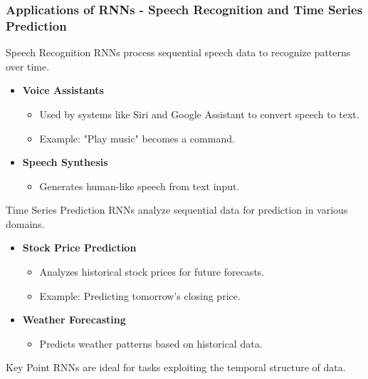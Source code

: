 \documentclass[aspectratio=169]{beamer}
\begin{document}
\begin{frame}[fragile]
    \frametitle{Applications of RNNs - Speech Recognition and Time Series Prediction}
    \begin{block}{Speech Recognition}
        RNNs process sequential speech data to recognize patterns over time.
    \end{block}
    
    \begin{itemize}
        \item \textbf{Voice Assistants}
            \begin{itemize}
                \item Used by systems like Siri and Google Assistant to convert speech to text.
                \item Example: "Play music" becomes a command.
            \end{itemize}
        
        \item \textbf{Speech Synthesis}
            \begin{itemize}
                \item Generates human-like speech from text input.
            \end{itemize}
    \end{itemize}

    \begin{block}{Time Series Prediction}
        RNNs analyze sequential data for prediction in various domains.
    \end{block}

    \begin{itemize}
        \item \textbf{Stock Price Prediction}
            \begin{itemize}
                \item Analyzes historical stock prices for future forecasts.
                \item Example: Predicting tomorrow's closing price.
            \end{itemize}
        
        \item \textbf{Weather Forecasting}
            \begin{itemize}
                \item Predicts weather patterns based on historical data.
            \end{itemize}
    \end{itemize}

    \begin{block}{Key Point}
        RNNs are ideal for tasks exploiting the temporal structure of data.
    \end{block}
\end{frame}
\end{document}
